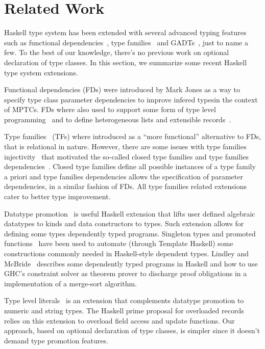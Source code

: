 \section{Related Work}
\label{sec:related-work}

Haskell type system has been extended with several advanced typing features
such as functional dependencies~\cite{Jones2008}, type families~\cite{Chakravarty2005} and
GADTs~\cite{Chen2016}, just to name a few. To the best of our knowledge, there's no
previous work on optional declaration of type classes. In this section, we
summarize some recent Haskell type system extensions.

Functional dependencies (FDs) were introduced by Mark Jones as a way to specify
type class parameter dependencies to improve infered typesin the
context of MPTCs. FDs where also used to support some form of type level
programming~\cite{Hallgren2000} and to define heterogeneous lists and
extensible records~\cite{KiselyovLS04}.

Type families~\cite{Chakravarty2005} (TFs) where introduced as a ``more functional'' alternative
to FDs, that is relational in nature. However, there are some issues with
type families injectivity~\cite{Eisenberg2014} that motivated the so-called closed type
families and type families dependencies~\cite{Eisenberg2014a}. Closed type families define all
possible instances of a type family a priori and type families dependencies allows
the specification of parameter dependencies, in a similar fashion of FDs.
All type families related extensions cater to better type improvement.

Datatype promotion~\cite{Yorgey2012,Eisenberg2014} is useful Haskell extension that lifts user
defined algebraic datatypes to kinds and data constructors to types. Such
extension allows for defining some types dependently typed programs.
Singleton types and promoted functions~\cite{Eisenberg2012} have been used to automate
(through Template Haskell) some constructions commonly needed in Haskell-style
dependent types. Lindley and McBride~\cite{Lindley2013} describes some dependently
typed programs in Haskell and how to use GHC's constraint solver as theorem
prover to discharge proof obligations in a implementation of a merge-sort
algorithm.

Type level literals~\cite{type-lits} is an extension that complements datatype
promotion to numeric and string types. The Haskell prime proposal for
overloaded records relies on this extension to overload field
access and update functions. Our approach, based on optional declaration of
type classes, is simpler since it doesn't demand type promotion features.
